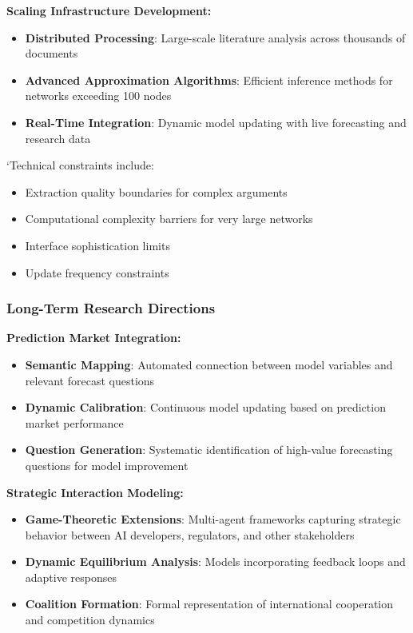 \documentclass[
  11pt,
  letterpaper,
]{book}
\providecommand{\tightlist}{%
  \setlength{\itemsep}{0pt}\setlength{\parskip}{0pt}}
\begin{document}
\textbf{Scaling Infrastructure Development:}

\begin{itemize}
\tightlist
\item
  \textbf{Distributed Processing}: Large-scale literature analysis
  across thousands of documents
\item
  \textbf{Advanced Approximation Algorithms}: Efficient inference
  methods for networks exceeding 100 nodes
\item
  \textbf{Real-Time Integration}: Dynamic model updating with live
  forecasting and research data
\end{itemize}

`Technical constraints include:

\begin{itemize}
\tightlist
\item
  Extraction quality boundaries for complex arguments
\item
  Computational complexity barriers for very large networks
\item
  Interface sophistication limits
\item
  Update frequency constraints
\end{itemize}

\subsubsection{Long-Term Research
Directions}\label{sec-long-term-research2}

\textbf{Prediction Market Integration:}

\begin{itemize}
\tightlist
\item
  \textbf{Semantic Mapping}: Automated connection between model
  variables and relevant forecast questions
\item
  \textbf{Dynamic Calibration}: Continuous model updating based on
  prediction market performance
\item
  \textbf{Question Generation}: Systematic identification of high-value
  forecasting questions for model improvement
\end{itemize}

\textbf{Strategic Interaction Modeling:}

\begin{itemize}
\tightlist
\item
  \textbf{Game-Theoretic Extensions}: Multi-agent frameworks capturing
  strategic behavior between AI developers, regulators, and other
  stakeholders
\item
  \textbf{Dynamic Equilibrium Analysis}: Models incorporating feedback
  loops and adaptive responses
\item
  \textbf{Coalition Formation}: Formal representation of international
  cooperation and competition dynamics
\end{itemize}
\end{document}
